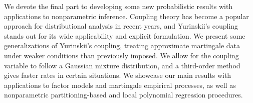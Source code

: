 We devote the final part to developing some new probabilistic results with
applications to nonparametric inference. Coupling theory has become a popular
approach for distributional analysis in recent years, and Yurinskii's coupling
stands out for its wide applicability and explicit formulation.
We present some generalizations of Yurinskii's coupling, treating approximate
martingale data under weaker conditions than previously imposed. We allow for
the coupling variable to follow a Gaussian mixture distribution, and a
third-order method gives faster rates in certain situations. We showcase our
main results with applications to factor models and martingale empirical
processes, as well as nonparametric partitioning-based and local polynomial
regression procedures.
